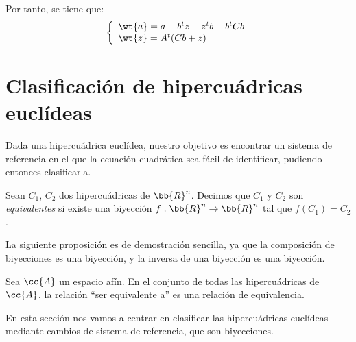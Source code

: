 Por tanto, se tiene que:
\begin{equation*}
    \left\{\begin{array}{l}
        \wt{a} = a+b^tz + z^tb + b^tCb \\
        \wt{z} = A^t(Cb+z)
    \end{array}\right.
\end{equation*}


\section{Clasificación de hipercuádricas euclídeas}

Dada una hipercuádrica euclídea, nuestro objetivo es encontrar un sistema de referencia en el que la ecuación cuadrática sea fácil de identificar, pudiendo entonces clasificarla.

\begin{definicion}
    Sean $C_1$, $C_2$ dos hipercuádricas de $\bb{R}^n$. Decimos que $C_1$ y $C_2$ son \emph{equivalentes} si existe una biyección $f:\bb{R}^n\to \bb{R}^n$ tal que $f(C_1)=C_2$.
\end{definicion}

La siguiente proposición es de demostración sencilla, ya que la composición de biyecciones es una biyección, y la inversa de una biyección es una biyección.
\begin{prop}
    Sea $\cc{A}$ un espacio afín. En el conjunto de todas las hipercuádricas de $\cc{A}$, la relación ``ser equivalente a'' es una relación de equivalencia.
\end{prop}

En esta sección nos vamos a centrar en clasificar las hipercuádricas euclídeas mediante cambios de sistema de referencia, que son biyecciones.


